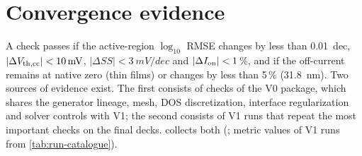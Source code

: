 \section{Convergence evidence}\label{sec:num-convergence}

A check passes if the active-region $\log_{10}$ RMSE changes by less than \SI{0.01}{dec}, $|\Delta V_{\mathrm{th,cc}}| < \SI{10}{mV}$,
$|\Delta \mathit{SS}| < \SI{3}{mV/dec}$ and $|\Delta I_{\mathrm{on}}| < 1$\,\%, and if the off-current remains at native zero (thin
films) or changes by less than 5\,\% (\SI{31.8}{nm}). Two sources of evidence exist. The first consists of checks of the
V0 package, which shares the generator lineage, mesh, DOS discretization, interface regularization and solver controls
with V1; the second consists of V1 runs that repeat the most important checks on the final decks.
 collects both (; metric values of V1 runs from
\cref{tab:run-catalogue}).

